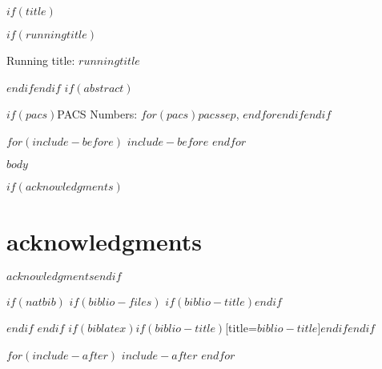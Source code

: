 \documentclass[$if(fontsize)$$fontsize$,$endif$$if(lang)$$lang$,$endif$$if(papersize)$$papersize$,$endif$$for(classoption)$$classoption$$sep$,$endfor$]{$documentclass$}
\begin{document}

$if(title)$\maketitle$if(runningtitle)$\begin{center}Running title: $runningtitle$\end{center}$endif$\newpage$endif$
$if(abstract)$\begin{abstract}$abstract$\end{abstract}$if(pacs)$\bigskip\bigskip\bigskip PACS Numbers: $for(pacs)$$pacs$$sep$, $endfor$$endif$\newpage$endif$

$for(include-before)$
$include-before$
$endfor$

$body$


$if(acknowledgments)$\section*{acknowledgments}$acknowledgments$\cleardoublepage$endif$

$if(natbib)$
$if(biblio-files)$
$if(biblio-title)$\renewcommand\refname{$biblio-title$}$endif$

$endif$
$endif$
$if(biblatex)$\printbibliography$if(biblio-title)$[title=$biblio-title$]$endif$$endif$


$for(include-after)$
$include-after$
$endfor$
\end{document}
